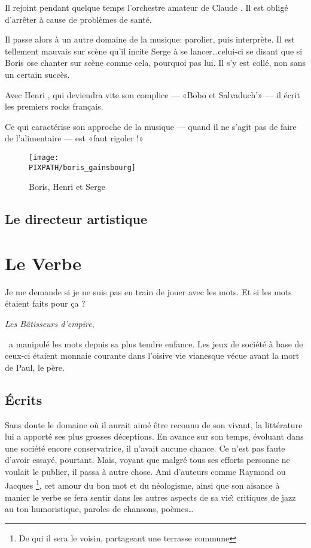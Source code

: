 Il rejoint pendant quelque temps l'orchestre amateur
de Claude . Il est obligé d'arrêter à cause
de problèmes de santé.

Il passe alors à un autre domaine de la musique: parolier, puis interprète. Il est tellement
mauvais sur scène qu'il incite Serge   à se lancer\ldots celui-ci se disant
que si Boris ose chanter sur scène comme cela, pourquoi pas lui. Il s'y est collé, non sans
un certain succès.

Avec Henri , qui deviendra vite son complice --- «Bobo et Salvaduch'» --- il
écrit les premiers rocks français.

Ce qui caractérise son approche de la musique --- quand il ne s'agit pas de faire de
l'alimentaire --- est «faut rigoler !»


\begin{figure}
\centering
\texttt{[image: \\PIXPATH/boris\_gainsbourg]}
\caption{Boris, Henri et Serge}
\end{figure}

\subsection{Le directeur artistique}

\section{Le Verbe}
\epigraph{Je me demande si je ne suis pas en train de jouer avec les mots. Et si les mots étaient faits pour ça ?}
{\emph{Les Bâtisseurs d'empire}, \BV}

\BV\ a manipulé les mots depuis sa plus tendre enfance. Les jeux de société à base
de ceux-ci étaient monnaie courante dans l'oisive vie vianesque vécue avant la mort
de Paul, le père.

\subsection{Écrits}

Sans doute le domaine où il aurait aimé être reconnu de son vivant, la littérature lui a apporté
ses plus grosses déceptions. En avance sur son temps, évoluant dans une société encore conservatrice,
il n'avait aucune chance. Ce n'est pas faute d'avoir essayé, pourtant. Mais, voyant que malgré tous
ses efforts personne ne voulait le publier, il passa à autre chose.
Ami d'auteurs comme Raymond  ou Jacques \footnote{De qui il sera le voisin, partageant une
terrasse commune}, cet amour du bon mot et du néologisme, ainsi que son aisance à manier
le verbe se fera sentir dans les autres aspects de sa vie\~: critiques de jazz au ton humoristique, paroles de chansons,
poèmes\ldots

